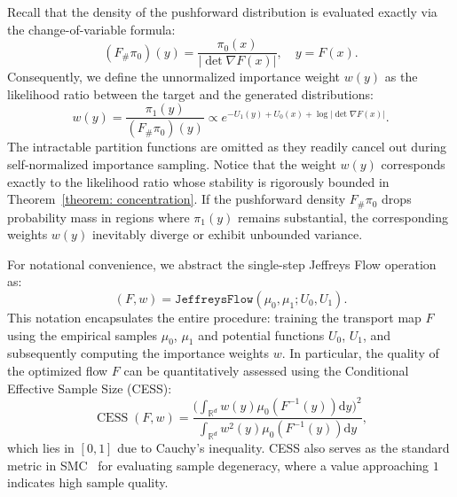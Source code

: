 \documentclass[%
 reprint,
 amsmath,amssymb,
 aps,
 pre,
]{revtex4-2}
\DeclareMathOperator{\CESS}{CESS}
\newcommand{\D}{\mathrm{d}}
\begin{document}
Recall that the density of the pushforward distribution is evaluated exactly via the change-of-variable formula:
\begin{equation*}
	(F_\#\pi_0)(y) = \frac{\pi_0(x)}{|\det \nabla F(x)|}, \quad y =F(x).
\end{equation*}
Consequently, we define the unnormalized importance weight $w(y)$ as the likelihood ratio between the target and the generated distributions:
\begin{equation}
	w(y) = \frac{\pi_1(y)}{(F_\#\pi_0)(y)} \propto e^{- U_1(y) + U_0(x) + \log|\det \nabla F(x)|}.
\end{equation}
The intractable partition functions are omitted as they readily cancel out during self-normalized importance sampling. Notice that the weight $w(y)$ corresponds exactly to the likelihood ratio whose stability is rigorously bounded in Theorem~\ref{theorem: concentration}. If the pushforward density $F_\#\pi_0$ drops probability mass in regions where $\pi_1(y)$ remains substantial, the corresponding weights $w(y)$ inevitably diverge or exhibit unbounded variance.

For notational convenience, we abstract the single-step Jeffreys Flow operation as:
\begin{equation*}
(F, w) = \mathtt{JeffreysFlow}(\mu_0 , \mu_1 ; U_0 , U_1 ).
\end{equation*}
This notation encapsulates the entire procedure: training the transport map $F$ using the empirical
samples $\mu_0$, $\mu_1$ and potential functions $U_0$, $U_1$, and subsequently computing the importance weights $w$. In particular, the quality of the optimized flow $F$ can be quantitatively assessed using the Conditional Effective Sample Size (CESS):
\begin{equation}
	\CESS(F,w) = \frac{\big(\int_{\mathbb R^d} w(y) \mu_0(F^{-1}(y))\D y\big)^2}{\int_{\mathbb R^d} w^2(y) \mu_0(F^{-1}(y))\D y},
\end{equation}
which lies in $[0,1]$ due to Cauchy's inequality. CESS also serves as the standard metric in SMC~\cite{doucet2001introduction} for evaluating sample degeneracy, where a value approaching $1$ indicates high sample quality.
\end{document}
